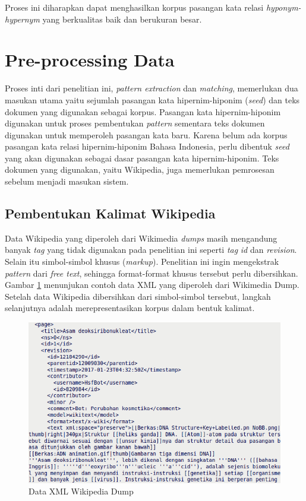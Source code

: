 \noindent Proses ini diharapkan dapat menghasilkan korpus pasangan kata relasi \textit{hyponym-hypernym} yang berkualitas baik dan berukuran besar.


\section{Pre-processing Data}
Proses inti dari penelitian ini, \textit{pattern extraction} dan \textit{matching}, memerlukan dua masukan utama yaitu sejumlah pasangan kata hipernim-hiponim (\textit{seed}) dan teks dokumen yang digunakan sebagai korpus. Pasangan kata hipernim-hiponim digunakan untuk proses pembentukan \textit{pattern} sementara teks dokumen digunakan untuk memperoleh pasangan kata baru. Karena belum ada korpus pasangan kata relasi hipernim-hiponim Bahasa Indonesia, perlu dibentuk \textit{seed} yang akan digunakan sebagai dasar pasangan kata hipernim-hiponim. Teks dokumen yang digunakan, yaitu Wikipedia, juga memerlukan pemrosesan sebelum menjadi masukan sistem.

\subsection{Pembentukan Kalimat Wikipedia}
Data Wikipedia yang diperoleh dari Wikimedia \textit{dumps} masih mengandung banyak \textit{tag} yang tidak digunakan pada penelitian ini seperti \textit{tag} \textit{id} dan \textit{revision}. Selain itu simbol-simbol khusus (\textit{markup}). Penelitian ini ingin mengekstrak \textit{pattern} dari \textit{free text}, sehingga format-format khusus tersebut perlu dibersihkan. Gambar \ref{fig:wiki-dump} menunjukan contoh data XML yang diperoleh dari Wikimedia Dump. Setelah data Wikipedia dibersihkan dari simbol-simbol tersebut, langkah selanjutnya adalah merepresentasikan korpus dalam bentuk kalimat. 

\begin{figure}
    \centering
    \includegraphics[width=\linewidth]{pics/WikipediaDump}
    \caption{Data XML Wikipedia Dump}
    \label{fig:wiki-dump}
\end{figure}

